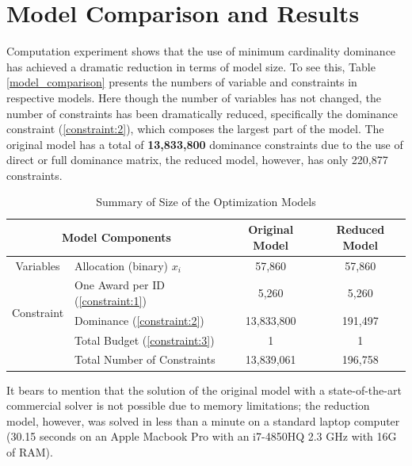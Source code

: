 \documentclass[12pt,english]{report}
\begin{document}
\section{Model Comparison and Results}
Computation experiment shows that the use of minimum cardinality dominance has
achieved a dramatic reduction in terms of model size.  To see this, Table
\ref{model_comparison} presents the numbers of variable and constraints in
respective models. Here though the number of variables has not changed, the
number of constraints has been dramatically reduced, specifically the dominance
constraint (\ref{constraint:2}), which composes the largest part of the model.
The original model has a total of \textbf{13,833,800} dominance constraints due
to the use of direct or full dominance matrix, the reduced model, however, has
only 220,877 constraints.

\begin{table}[]
\centering
\begin{tabular}{|c|l|c|c|}
\hline
\multicolumn{2}{|c|}{Model Components}                                        &
Original Model & Reduced Model \\ \hline
Variables                   & \multicolumn{1}{|l|}{Allocation (binary)  $x_i$}
& 57,860         & 57,860        \\ \hline
\multirow{3}{*}{Constraint} & One Award per ID  (\ref{constraint:1})        &
5,260          & 5,260         \\ \cline{2-4}
& Dominance  (\ref{constraint:2})               & 13,833,800     & 191,497
\\ \cline{2-4}
& Total Budget   (\ref{constraint:3})           & 1              & 1
\\ \cline{2-4}
& Total Number of Constraints                   & 13,839,061     & 196,758
\\ \hline
\end{tabular}
\caption{Summary of Size of the Optimization Models }
\label{model_comparison}
\label{size_model}
\end{table}

It bears to mention that the solution of the original model with a
state-of-the-art commercial solver is not possible due to memory limitations;
the reduction model, however,  was solved in less than a minute on a standard
laptop computer (30.15 seconds on an Apple Macbook Pro with an i7-4850HQ 2.3
GHz with 16G of RAM).
\end{document}
